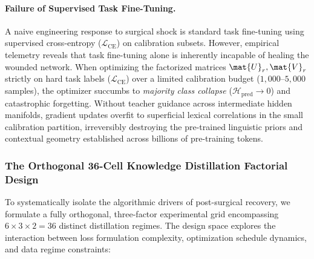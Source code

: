 \paragraph{Failure of Supervised Task Fine-Tuning.}
A naive engineering response to surgical shock is standard task fine-tuning using supervised cross-entropy ($\mathcal{L}_{\text{CE}}$) on calibration subsets. However, empirical telemetry reveals that task fine-tuning alone is inherently incapable of healing the wounded network. When optimizing the factorized matrices $\mat{U}_r, \mat{V}_r$ strictly on hard task labels ($\mathcal{L}_{\text{CE}}$) over a limited calibration budget ($1{,}000\text{--}5{,}000$ samples), the optimizer succumbs to \emph{majority class collapse} ($\mathcal{H}_{\text{pred}} \to 0$) and catastrophic forgetting. Without teacher guidance across intermediate hidden manifolds, gradient updates overfit to superficial lexical correlations in the small calibration partition, irreversibly destroying the pre-trained linguistic priors and contextual geometry established across billions of pre-training tokens.

\subsubsection{The Orthogonal 36-Cell Knowledge Distillation Factorial Design}
\label{sec:ablations_factorial_design}

To systematically isolate the algorithmic drivers of post-surgical recovery, we formulate a fully orthogonal, three-factor experimental grid encompassing $6 \times 3 \times 2 = 36$ distinct distillation regimes. The design space explores the interaction between loss formulation complexity, optimization schedule dynamics, and data regime constraints:

